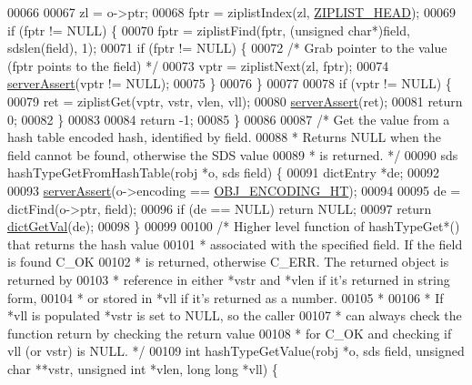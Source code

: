 \begin{DoxyCode}
00066 
00067     zl = o->ptr;
00068     fptr = ziplistIndex(zl, \hyperlink{ziplist_8h_a88d32e547c509220e1c50cd9306186ba}{ZIPLIST\_HEAD});
00069     \textcolor{keywordflow}{if} (fptr != NULL) \{
00070         fptr = ziplistFind(fptr, (\textcolor{keywordtype}{unsigned} \textcolor{keywordtype}{char}*)field, sdslen(field), 1);
00071         \textcolor{keywordflow}{if} (fptr != NULL) \{
00072             \textcolor{comment}{/* Grab pointer to the value (fptr points to the field) */}
00073             vptr = ziplistNext(zl, fptr);
00074             \hyperlink{server_8h_a88114b5169b4c382df6b56506285e56a}{serverAssert}(vptr != NULL);
00075         \}
00076     \}
00077 
00078     \textcolor{keywordflow}{if} (vptr != NULL) \{
00079         ret = ziplistGet(vptr, vstr, vlen, vll);
00080         \hyperlink{server_8h_a88114b5169b4c382df6b56506285e56a}{serverAssert}(ret);
00081         \textcolor{keywordflow}{return} 0;
00082     \}
00083 
00084     \textcolor{keywordflow}{return} -1;
00085 \}
00086 
00087 \textcolor{comment}{/* Get the value from a hash table encoded hash, identified by field.}
00088 \textcolor{comment}{ * Returns NULL when the field cannot be found, otherwise the SDS value}
00089 \textcolor{comment}{ * is returned. */}
00090 sds hashTypeGetFromHashTable(robj *o, sds field) \{
00091     dictEntry *de;
00092 
00093     \hyperlink{server_8h_a88114b5169b4c382df6b56506285e56a}{serverAssert}(o->encoding == \hyperlink{server_8h_a9c10219f68afc557d510d108257d238b}{OBJ\_ENCODING\_HT});
00094 
00095     de = dictFind(o->ptr, field);
00096     \textcolor{keywordflow}{if} (de == NULL) \textcolor{keywordflow}{return} NULL;
00097     \textcolor{keywordflow}{return} \hyperlink{dict_8h_ae8d2cc391873b2bea2b87c4f80f43120}{dictGetVal}(de);
00098 \}
00099 
00100 \textcolor{comment}{/* Higher level function of hashTypeGet*() that returns the hash value}
00101 \textcolor{comment}{ * associated with the specified field. If the field is found C\_OK}
00102 \textcolor{comment}{ * is returned, otherwise C\_ERR. The returned object is returned by}
00103 \textcolor{comment}{ * reference in either *vstr and *vlen if it's returned in string form,}
00104 \textcolor{comment}{ * or stored in *vll if it's returned as a number.}
00105 \textcolor{comment}{ *}
00106 \textcolor{comment}{ * If *vll is populated *vstr is set to NULL, so the caller}
00107 \textcolor{comment}{ * can always check the function return by checking the return value}
00108 \textcolor{comment}{ * for C\_OK and checking if vll (or vstr) is NULL. */}
00109 \textcolor{keywordtype}{int} hashTypeGetValue(robj *o, sds field, \textcolor{keywordtype}{unsigned} \textcolor{keywordtype}{char} **vstr, \textcolor{keywordtype}{unsigned} \textcolor{keywordtype}{int} *vlen, \textcolor{keywordtype}{long} \textcolor{keywordtype}{long} *vll) \{

\end{DoxyCode}
